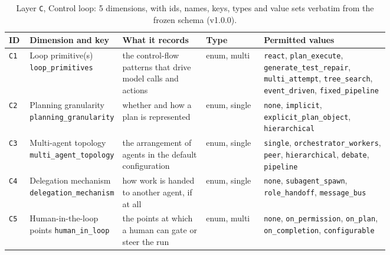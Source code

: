 \begin{table}[htbp]
\caption{Layer \texttt{C}, Control loop: 5 dimensions, with ids, names, keys, types and value
sets verbatim from the frozen schema (v1.0.0).}
\label{tab:coding-C}
\footnotesize
\begin{tabular}{@{}l p{0.20\linewidth} p{0.22\linewidth} l p{0.33\linewidth}@{}}
\toprule
ID & Dimension and key & What it records & Type & Permitted values \tabularnewline
\midrule
\texttt{C1} & \raggedright Loop primitive(s) \newline \texttt{loop\_primitives} & \raggedright the control-flow patterns that drive model calls and actions & enum, multi & \raggedright \texttt{react}, \texttt{plan\_execute}, \texttt{generate\_test\_repair}, \texttt{multi\_attempt}, \texttt{tree\_search}, \texttt{event\_driven}, \texttt{fixed\_pipeline} \tabularnewline
\texttt{C2} & \raggedright Planning granularity \newline \texttt{planning\_granularity} & \raggedright whether and how a plan is represented & enum, single & \raggedright \texttt{none}, \texttt{implicit}, \texttt{explicit\_plan\_object}, \texttt{hierarchical} \tabularnewline
\texttt{C3} & \raggedright Multi-agent topology \newline \texttt{multi\_agent\_topology} & \raggedright the arrangement of agents in the default configuration & enum, single & \raggedright \texttt{single}, \texttt{orchestrator\_workers}, \texttt{peer}, \texttt{hierarchical}, \texttt{debate}, \texttt{pipeline} \tabularnewline
\texttt{C4} & \raggedright Delegation mechanism \newline \texttt{delegation\_mechanism} & \raggedright how work is handed to another agent, if at all & enum, single & \raggedright \texttt{none}, \texttt{subagent\_spawn}, \texttt{role\_handoff}, \texttt{message\_bus} \tabularnewline
\texttt{C5} & \raggedright Human-in-the-loop points \newline \texttt{human\_in\_loop} & \raggedright the points at which a human can gate or steer the run & enum, multi & \raggedright \texttt{none}, \texttt{on\_permission}, \texttt{on\_plan}, \texttt{on\_completion}, \texttt{configurable} \tabularnewline
\bottomrule
\end{tabular}
\end{table}

